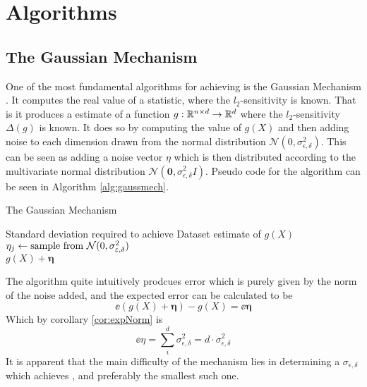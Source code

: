 \documentclass[a4paper,12pt]{article}
\newcommand{\Desc}[2]{\State \makebox[6em][l]{#1}#2}
\begin{document}
\section{Algorithms}
\subsection{The Gaussian Mechanism}
One of the most fundamental algorithms for achieving 
\edp is the Gaussian Mechanism \cite{dpbasic}. It computes the real
value of a statistic, where the $l_2$-sensitivity is known.
That is it produces a \edp estimate of a function 
$g: \R^{n \times d} \rightarrow \R^{d}$ where the $l_2$-sensitivity $ \Delta(g) $ 
is known.
It does so by computing the value of $g(X)$ and then adding noise
to each dimension drawn from the normal distribution 
$\mathcal{N}(0, \sigma_{\epsilon,\delta}^2)$.
This can be seen as adding a noise vector $\eta$ which 
is then distributed according to
the multivariate normal distribution 
$\mathcal{N}(\bm{0}, \sigma_{\epsilon,\delta}^2I)$. 
Pseudo code for the algorithm can be seen in Algorithm \ref{alg:gaussmech}.

\begin{algorithm}
\caption{The Gaussian Mechanism}\label{alg:gaussmech}
\begin{algorithmic}
    \Input
    \Desc{$\sigma_{\epsilon,\delta}$}{Standard deviation required to achieve \edp}
    \Desc{$X \in \R^{n \times d}$}{Dataset}
    \EndInput
    \Output
    \State\edp estimate of $g(X)$
    \EndOutput
        \State$\eta_j \gets \textnormal{sample from } \mathcal{N}(0, \sigma_{\epsilon,\delta}^2)$
    \EndFor \\
    \Return$g(X) + \bm{\eta}$
\end{algorithmic}
\end{algorithm}
\noindent The algorithm quite intuitively prodcues error which is purely given by the norm of the noise added, and the expected error can be calculated to be
\[
    \ee{(g(X) + \bm{\eta}) - g(X)} = 
    \ee{\bm{\eta}}
\]
Which by corollary \ref{cor:expNorm} is 
\begin{equation}
\label{eq:ExpErrGM}
    \ee{\eta} = \sum_i^d \sigma_{\epsilon,\delta}^2 = d \cdot \sigma_{\epsilon,\delta}^2
\end{equation}
It is apparent that the main difficulty of the mechanism 
lies in determining a $\sigma_{\epsilon, \delta}$ which achieves
\edp, and preferably the smallest such one.
\end{document}
